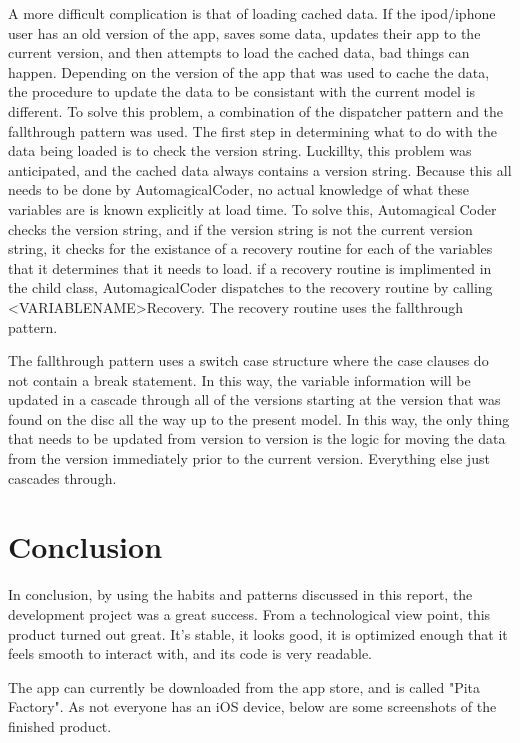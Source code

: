 \documentclass[se]{uw-wkrpt}
\begin{document}
A more difficult complication is that of loading cached data. If the ipod/iphone user has an old version of the
app, saves some data, updates their app to the current version, and then attempts to load the cached data,
bad things can happen. Depending on the version of the app that was used to cache the data, the procedure
to update the data to be consistant with the current model is different. To solve this problem, a combination
of the dispatcher pattern and the fallthrough pattern was used. The first step in determining what to do
with the data being loaded is to check the version string. Luckillty, this problem was anticipated, and 
the cached data always contains a version string. Because this all needs to be done by AutomagicalCoder,
no actual knowledge of what these variables are is known explicitly at load time. To solve this, Automagical
Coder checks the version string, and if the version string is not the current version string, it checks for
the existance of a recovery routine for each of the variables that it determines that it needs to load.
if a recovery routine is implimented in the child class, AutomagicalCoder dispatches to the recovery 
routine by calling <VARIABLENAME>Recovery. The recovery routine uses the fallthrough pattern.

The fallthrough pattern uses a switch case structure where the case clauses do not contain a break statement.
In this way, the variable information will be updated in a cascade through all of the versions starting
at the version that was found on the disc all the way up to the present model. In this way, the only
thing that needs to be updated from version to version is the logic for moving the data from the version
immediately prior to the current version. Everything else just cascades through.

\section{Conclusion}

In conclusion, by using the habits and patterns discussed in this report, the development project was a 
great success. From a technological view point, this product turned out great. It's stable, it looks good,
it is optimized enough that it feels smooth to interact with, and its code is very readable. 

The app can currently be downloaded from the app store, and is called "Pita Factory". As
not everyone has an iOS device, below are some screenshots of the finished product.
\end{document}
